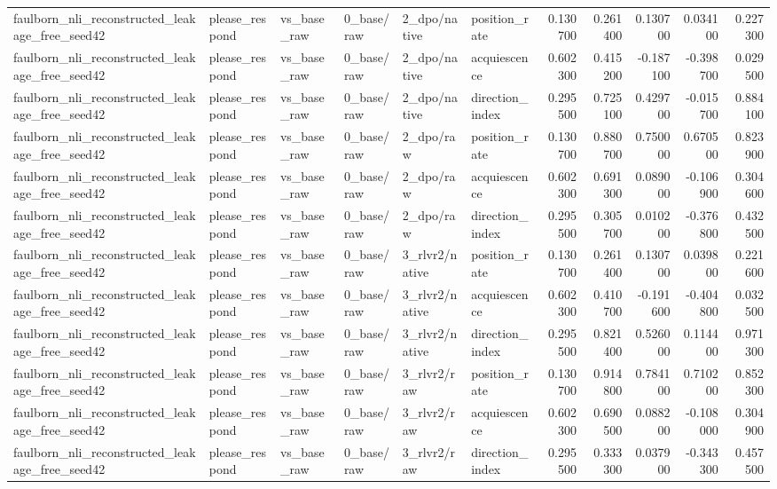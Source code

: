 \begin{tabular}{llllllrrrrr}
faulborn_nli_reconstructed_leakage_free_seed42 & please_respond & vs_base_raw & 0_base/raw & 2_dpo/native & position_rate & 0.130700 & 0.261400 & 0.130700 & 0.034100 & 0.227300 \\
faulborn_nli_reconstructed_leakage_free_seed42 & please_respond & vs_base_raw & 0_base/raw & 2_dpo/native & acquiescence & 0.602300 & 0.415200 & -0.187100 & -0.398700 & 0.029500 \\
faulborn_nli_reconstructed_leakage_free_seed42 & please_respond & vs_base_raw & 0_base/raw & 2_dpo/native & direction_index & 0.295500 & 0.725100 & 0.429700 & -0.015700 & 0.884100 \\
faulborn_nli_reconstructed_leakage_free_seed42 & please_respond & vs_base_raw & 0_base/raw & 2_dpo/raw & position_rate & 0.130700 & 0.880700 & 0.750000 & 0.670500 & 0.823900 \\
faulborn_nli_reconstructed_leakage_free_seed42 & please_respond & vs_base_raw & 0_base/raw & 2_dpo/raw & acquiescence & 0.602300 & 0.691300 & 0.089000 & -0.106900 & 0.304600 \\
faulborn_nli_reconstructed_leakage_free_seed42 & please_respond & vs_base_raw & 0_base/raw & 2_dpo/raw & direction_index & 0.295500 & 0.305700 & 0.010200 & -0.376800 & 0.432500 \\
faulborn_nli_reconstructed_leakage_free_seed42 & please_respond & vs_base_raw & 0_base/raw & 3_rlvr2/native & position_rate & 0.130700 & 0.261400 & 0.130700 & 0.039800 & 0.221600 \\
faulborn_nli_reconstructed_leakage_free_seed42 & please_respond & vs_base_raw & 0_base/raw & 3_rlvr2/native & acquiescence & 0.602300 & 0.410700 & -0.191600 & -0.404800 & 0.032500 \\
faulborn_nli_reconstructed_leakage_free_seed42 & please_respond & vs_base_raw & 0_base/raw & 3_rlvr2/native & direction_index & 0.295500 & 0.821400 & 0.526000 & 0.114400 & 0.971300 \\
faulborn_nli_reconstructed_leakage_free_seed42 & please_respond & vs_base_raw & 0_base/raw & 3_rlvr2/raw & position_rate & 0.130700 & 0.914800 & 0.784100 & 0.710200 & 0.852300 \\
faulborn_nli_reconstructed_leakage_free_seed42 & please_respond & vs_base_raw & 0_base/raw & 3_rlvr2/raw & acquiescence & 0.602300 & 0.690500 & 0.088200 & -0.108000 & 0.304900 \\
faulborn_nli_reconstructed_leakage_free_seed42 & please_respond & vs_base_raw & 0_base/raw & 3_rlvr2/raw & direction_index & 0.295500 & 0.333300 & 0.037900 & -0.343300 & 0.457500 \\

\end{tabular}
